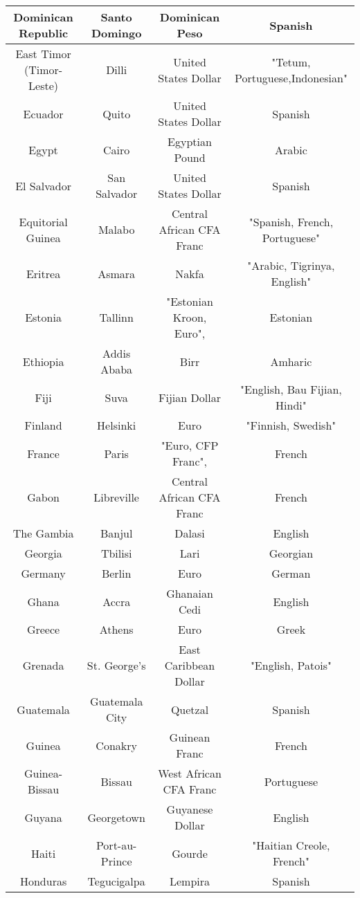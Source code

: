 \documentclass{article}
\begin{document}
\begin{center}
\begin{tabular}{||  c c c c  ||}
Dominican Republic & Santo Domingo & Dominican Peso & Spanish   \\ \hline 
East Timor (Timor-Leste) & Dilli & United States Dollar & "Tetum, Portuguese,Indonesian"   \\ \hline 
Ecuador & Quito & United States Dollar & Spanish   \\ \hline 
Egypt & Cairo & Egyptian Pound & Arabic   \\ \hline 
El Salvador & San Salvador & United States Dollar & Spanish   \\ \hline 
Equitorial Guinea & Malabo & Central African CFA Franc & "Spanish, French, Portuguese"   \\ \hline 
Eritrea & Asmara & Nakfa & "Arabic, Tigrinya, English"   \\ \hline 
Estonia & Tallinn & "Estonian Kroon, Euro", & Estonian   \\ \hline 
Ethiopia & Addis Ababa & Birr & Amharic   \\ \hline 
Fiji & Suva & Fijian Dollar & "English, Bau Fijian, Hindi"   \\ \hline 
Finland & Helsinki & Euro & "Finnish, Swedish"   \\ \hline 
France & Paris & "Euro, CFP Franc", & French   \\ \hline 
Gabon & Libreville & Central African CFA Franc & French   \\ \hline 
The Gambia & Banjul & Dalasi & English   \\ \hline 
Georgia & Tbilisi & Lari & Georgian   \\ \hline 
Germany & Berlin & Euro & German   \\ \hline 
Ghana & Accra & Ghanaian Cedi & English   \\ \hline 
Greece & Athens & Euro & Greek   \\ \hline 
Grenada & St. George's & East Caribbean Dollar & "English, Patois"   \\ \hline 
Guatemala & Guatemala City & Quetzal & Spanish   \\ \hline 
Guinea & Conakry & Guinean Franc & French   \\ \hline 
Guinea-Bissau & Bissau & West African CFA Franc & Portuguese   \\ \hline 
Guyana & Georgetown & Guyanese Dollar & English   \\ \hline 
Haiti & Port-au-Prince & Gourde & "Haitian Creole, French"   \\ \hline 
Honduras & Tegucigalpa & Lempira & Spanish   \\ \hline 

\end{tabular}
\end{center}
\end{document}
